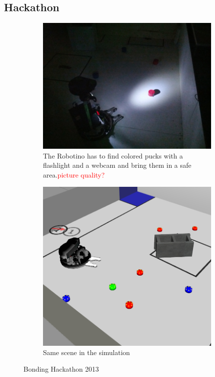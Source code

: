 \subsection{Hackathon}
\begin{figure}
  \centering
  \begin{subfigure}[b]{0.48\textwidth}
    \includegraphics[width=\textwidth]{pics/hackathon_real}
    \caption{The Robotino has to find colored pucks with a flashlight and a webcam and bring them in a safe area.\textcolor{red}{picture quality?}}
    \label{fig:hackathon_real}
  \end{subfigure}
  \begin{subfigure}[b]{0.48\textwidth}
    \includegraphics[width=\textwidth]{pics/hackathon_sim}
    \caption{Same scene in the simulation}
    \label{fig:hackathon_sim}
  \end{subfigure}
  \caption{Bonding Hackathon 2013}
  \label{fig:hackathon}
\end{figure}
